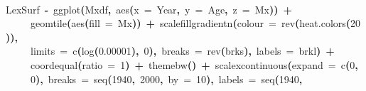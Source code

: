 \documentclass[a4paper]{article}
\newcommand{\hlnumber}[1]{\textcolor[rgb]{0.0823529411764706,0.0784313725490196,0.709803921568627}{#1}}%
\newcommand{\hlfunctioncall}[1]{\textcolor[rgb]{1,0,0}{#1}}%
\newcommand{\hlkeyword}[1]{\textcolor[rgb]{0,0,0}{\textbf{#1}}}%
\newcommand{\hlargument}[1]{\textcolor[rgb]{0.694117647058824,0.247058823529412,0.0196078431372549}{#1}}%
\newcommand{\hlassignement}[1]{\textcolor[rgb]{0.215686274509804,0.215686274509804,0.384313725490196}{\textbf{#1}}}%
\newcommand{\hlsymbol}[1]{\textcolor[rgb]{0,0,0}{#1}}%
\newcommand{\hlprompt}[1]{\textcolor[rgb]{0,0,0}{#1}}%
\newcommand{\hlstd}[1]{\textcolor[rgb]{0,0,0}{#1}}%
\newenvironment{Houtput}{\raggedright}{%
%
}
\begin{document}
\begin{Houtput}
\hspace*{\fill}\\
\hlstd{}\ttfamily\noindent
\hlprompt{\usebox{\hlnormalsizeboxgreaterthan}{\ }}\hlsymbol{LexSurf}{\ }\hlassignement{\usebox{\hlnormalsizeboxlessthan}-}{\ }\hlfunctioncall{ggplot}\hlkeyword{(}\hlsymbol{Mxdf}\hlkeyword{,}{\ }\hlfunctioncall{aes}\hlkeyword{(}\hlargument{x}{\ }\hlargument{=}{\ }\hlsymbol{Year}\hlkeyword{,}{\ }\hlargument{y}{\ }\hlargument{=}{\ }\hlsymbol{Age}\hlkeyword{,}{\ }\hlargument{z}{\ }\hlargument{=}{\ }\hlsymbol{Mx}\hlkeyword{)}\hlkeyword{)}{\ }\hlkeyword{+}\hspace*{\fill}\\
\hlstd{}\hlprompt{{\ }}{\ }{\ }{\ }{\ }\hlfunctioncall{geom\usebox{\hlnormalsizeboxunderscore}tile}\hlkeyword{(}\hlfunctioncall{aes}\hlkeyword{(}\hlargument{fill}{\ }\hlargument{=}{\ }\hlsymbol{Mx}\hlkeyword{)}\hlkeyword{)}{\ }\hlkeyword{+}{\ }\hlfunctioncall{scale\usebox{\hlnormalsizeboxunderscore}fill\usebox{\hlnormalsizeboxunderscore}gradientn}\hlkeyword{(}\hlargument{colour}{\ }\hlargument{=}{\ }\hlfunctioncall{rev}\hlkeyword{(}\hlfunctioncall{heat.colors}\hlkeyword{(}\hlnumber{20}\hlkeyword{)}\hlkeyword{)}\hlkeyword{,}\hspace*{\fill}\\
\hlstd{}\hlprompt{{\ }}{\ }{\ }{\ }{\ }\hlargument{limits}{\ }\hlargument{=}{\ }\hlfunctioncall{c}\hlkeyword{(}\hlfunctioncall{log}\hlkeyword{(}\hlnumber{0.00001}\hlkeyword{)}\hlkeyword{,}{\ }\hlnumber{0}\hlkeyword{)}\hlkeyword{,}{\ }\hlargument{breaks}{\ }\hlargument{=}{\ }\hlfunctioncall{rev}\hlkeyword{(}\hlsymbol{brks}\hlkeyword{)}\hlkeyword{,}{\ }\hlargument{labels}{\ }\hlargument{=}{\ }\hlsymbol{brkl}\hlkeyword{)}{\ }\hlkeyword{+}\hspace*{\fill}\\
\hlstd{}\hlprompt{{\ }}{\ }{\ }{\ }{\ }\hlfunctioncall{coord\usebox{\hlnormalsizeboxunderscore}equal}\hlkeyword{(}\hlargument{ratio}{\ }\hlargument{=}{\ }\hlnumber{1}\hlkeyword{)}{\ }\hlkeyword{+}{\ }\hlfunctioncall{theme\usebox{\hlnormalsizeboxunderscore}bw}\hlkeyword{(}\hlkeyword{)}{\ }\hlkeyword{+}{\ }\hlfunctioncall{scale\usebox{\hlnormalsizeboxunderscore}x\usebox{\hlnormalsizeboxunderscore}continuous}\hlkeyword{(}\hlargument{expand}{\ }\hlargument{=}{\ }\hlfunctioncall{c}\hlkeyword{(}\hlnumber{0}\hlkeyword{,}\hspace*{\fill}\\
\hlstd{}\hlprompt{{\ }}{\ }{\ }{\ }{\ }\hlnumber{0}\hlkeyword{)}\hlkeyword{,}{\ }\hlargument{breaks}{\ }\hlargument{=}{\ }\hlfunctioncall{seq}\hlkeyword{(}\hlnumber{1940}\hlkeyword{,}{\ }\hlnumber{2000}\hlkeyword{,}{\ }\hlargument{by}{\ }\hlargument{=}{\ }\hlnumber{10}\hlkeyword{)}\hlkeyword{,}{\ }\hlargument{labels}{\ }\hlargument{=}{\ }\hlfunctioncall{seq}\hlkeyword{(}\hlnumber{1940}\hlkeyword{,}\hspace*{\fill}\\

\end{Houtput}
\end{document}
